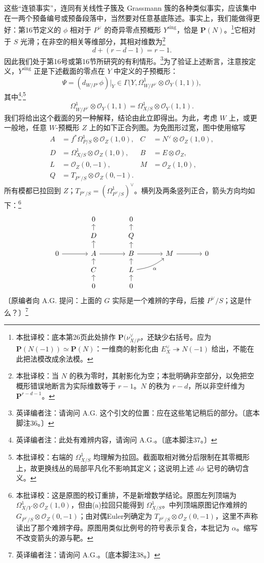 \documentclass{ctexbook}
\newcommand{\ednote}[1]{\footnote{英译编者注：#1}}
\newcommand{\corr}[1]{\footnote{本批译校：#1}}
\newcommand{\cO}{\mathcal O}
\begin{document}
这些“连锁事实”，连同有关线性子簇及 Grassmann 簇的各种类似事实，应该集中在一两个预备编号或预备段落中，当然要对任意基底陈述。事实上，我们能做得更好：第16节定义的 $\phi$ 相对于 $P^\vee$ 的奇异零点预概形 $Y^{\mathrm{sing}}$，恰是 $\mathbf P(N)$。\corr{底本第26页此处排作 $\mathbf P(\nu_{X/P}^{\vee}$，还缺少右括号。应为 $\mathbf P(N(-1))\simeq\mathbf P(N)$：一维商的射影化由 $E_X^\vee\twoheadrightarrow N(-1)$ 给出，不能在此把法模改成余法模。}它相对于 $S$ 光滑；在非空的相关等维部分，其相对维数为\corr{当 $N$ 的秩为零时，其射影化为空；本批明确非空部分，以免把空概形错误地断言为实际维数等于 $r-1$。$N$ 的秩为 $r-d$，所以非空纤维为 $\mathbf P^{r-d-1}$。}
\[
d+(r-d-1)=r-1.
\]
因此我们处于第16号或第16节所研究的有利情形。\ednote{请询问 A.G. 这个引文的位置：应在这些笔记稍后的部分。〔底本脚注36。〕}为了验证上述断言，注意按定义，$Y^{\mathrm{sing}}$ 正是下述截面的零点在 $Y$ 中定义的子预概形：
\[
\Psi=(d_{W/P^\vee}\phi)|_Y
\in\Gamma\bigl(Y,\Omega^1_{W/P^\vee}\otimes\cO_Y(1,1)\bigr),
\]
其中\ednote{此处有难辨内容，请询问 A.G.。〔底本脚注37。〕}\textsuperscript{,}\corr{右端的 $\Omega^1_{X/S}$ 均理解为拉回。截面取相对微分后限制在其零概形上，故更换线丛的局部平凡化不影响其定义；这说明上述 $d\phi$ 记号的确切含义。}
\[
\Omega^1_{W/P^\vee}\otimes\cO_Y(1,1)
=\Omega^1_{X/S}\otimes\cO_Y(1,1).
\]
我们将给出这个截面的另一种解释，结论由此立即得出。为此，考虑 $W$ 上，或更一般地，任意 $W$-预概形 $Z$ 上的如下正合列图。为免图形过宽，图中使用缩写
\[
\begin{aligned}
 A&=f^*\Omega^1_{P/S}\otimes\cO_Z(1,0),& C&=N^\vee\otimes\cO_Z(1,0),\\
 D&=\Omega^1_{X/S}\otimes\cO_Z(1,0),& B&=E\otimes\cO_Z,\\
 L&=\cO_Z(0,-1),& M&=\cO_Z(1,0),\\
 Q&=T_{P^\vee/S}\otimes\cO_Z(0,-1).&&
\end{aligned}
\]
所有模都已拉回到 $Z$；$T_{P^\vee/S}=(\Omega^1_{P^\vee/S})^\vee$。横列及两条竖列正合，箭头方向均如下：\corr{这是原图的校订重排，不是新增数学结论。原图左列顶端为 $\Omega^1_{X/Y}\otimes\cO_Z(1,0)$，但由(a)拉回只能得到 $\Omega^1_{X/S}$。中列顶端原图记作难辨的 $G_{P^\vee/S}\otimes\cO_Z(0,-1)$；由对偶Euler列确定为 $T_{P^\vee/S}\otimes\cO_Z(0,-1)$，这里不声称读出了那个难辨字母。原图用类似比例号的符号表示复合，本批记为 $\alpha$。缩写不改变箭头的源与靶。}
\[
\begin{tikzcd}[row sep=small,column sep=large]
 &0&0&\\
 &D\arrow[u]&Q\arrow[u]&\\
 0\arrow[r]&A\arrow[u]\arrow[r]&B\arrow[u]\arrow[r]&M\arrow[r]&0\\
 &C\arrow[u]&L\arrow[u]\arrow[ur,bend right=15,"\alpha"']&\\
 &0\arrow[u]&0\arrow[u]&
\end{tikzcd}
\]
〔原编者向 A.G. 提问：上面的 $G$ 实际是一个难辨的字母，后接 $P^\vee/S$；这是什么？〕\ednote{请询问 A.G.。〔底本脚注38。〕}
\end{document}

